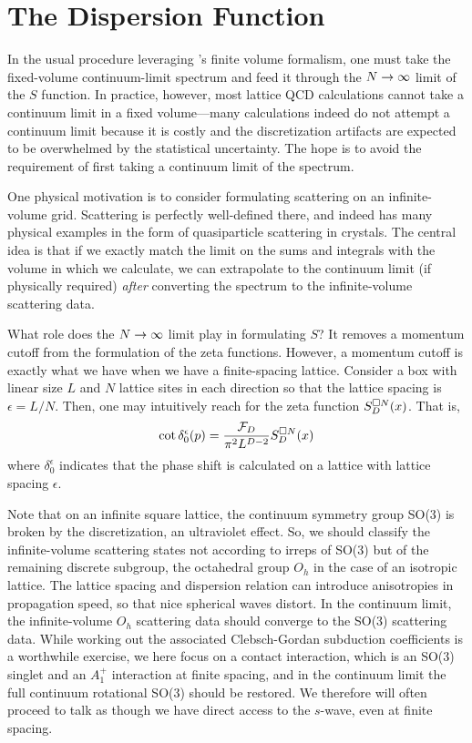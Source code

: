 \section{The Dispersion Function}\label{sec:dispersion}

In the usual procedure leveraging \Luscher's finite volume formalism, one must take the fixed-volume continuum-limit spectrum and feed it through the $N\rightarrow\infty$ limit of the $S$ function.
In practice, however, most lattice QCD calculations cannot take a continuum limit in a fixed volume---many calculations indeed do not attempt a continuum limit because it is costly and the discretization artifacts are expected to be overwhelmed by the statistical uncertainty.
The hope is to avoid the requirement of first taking a continuum limit of the spectrum.

One physical motivation is to consider formulating scattering on an infinite-volume grid.
Scattering is perfectly well-defined there, and indeed has many physical examples in the form of quasiparticle scattering in crystals.
The central idea is that if we exactly match the limit on the sums and integrals with the volume in which we calculate, we can extrapolate to the continuum limit (if physically required) \emph{after} converting the spectrum to the infinite-volume scattering data.

What role does the $N\rightarrow\infty$ limit play in formulating $S$?
It removes a momentum cutoff from the formulation of the zeta functions.
However, a momentum cutoff is exactly what we have when we have a finite-spacing lattice.
Consider a box with linear size $L$ and $N$ lattice sites in each direction so that the lattice spacing is $\epsilon=L/N$.
Then, one may intuitively reach for the zeta function $S_D^{\square N}(x)$.  That is,
\begin{equation}\label{eq:cutoff cartesian S}
    \cot \delta_0^\epsilon(p) = \frac{\mathcal{F}_D}{\pi^2 L^{D-2}} S_D^{\square N}(x)
\end{equation}
where $\delta_0^\epsilon$ indicates that the phase shift is calculated on a lattice with lattice spacing $\epsilon$.

Note that on an infinite square lattice, the continuum symmetry group SO(3) is broken by the discretization, an ultraviolet effect.
So, we should classify the infinite-volume scattering states not according to irreps of SO(3) but of the remaining discrete subgroup, the octahedral group $O_h$ in the case of an isotropic lattice.
The lattice spacing and dispersion relation can introduce anisotropies in propagation speed, so that nice spherical waves distort.
In the continuum limit, the infinite-volume $O_h$ scattering data should converge to the SO(3) scattering data.
While working out the associated Clebsch-Gordan subduction coefficients is a worthwhile exercise, we here focus on a contact interaction, which is an SO(3) singlet and an $A_1^+$ interaction at finite spacing, and in the continuum limit the full continuum rotational SO(3) should be restored.
We therefore will often proceed to talk as though we have direct access to the $s$-wave, even at finite spacing.

